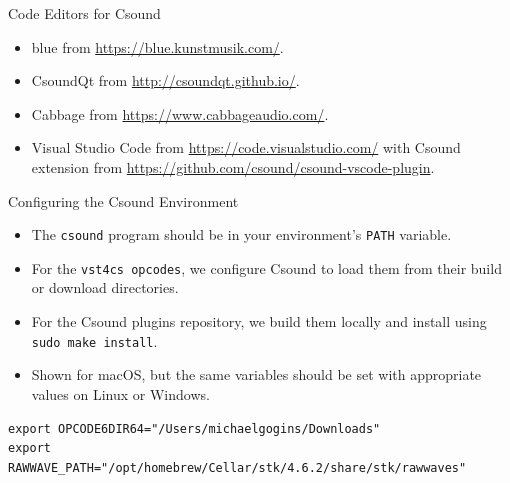 \documentclass{beamer}
\begin{document}
    \begin{frame}{Code Editors for Csound}
        \begin{itemize}
            \item blue from \url{https://blue.kunstmusik.com/}.
            \item CsoundQt from \url{http://csoundqt.github.io/}.
            \item Cabbage from \url{https://www.cabbageaudio.com/}.
            \item Visual Studio Code from \url{https://code.visualstudio.com/} with
            Csound extension from \url{https://github.com/csound/csound-vscode-plugin}.
        \end{itemize}
    \end{frame}
    
    \begin{frame}{Configuring the Csound Environment}
    	\begin{itemize}
		\item The \texttt{csound} program should be in your environment's \texttt{PATH} variable.
		\item For the \texttt{vst4cs opcodes}, we configure Csound to load them from their build or download directories.
		\item For the Csound plugins repository, we build them locally and install using \texttt{sudo make install}.
		\item Shown for macOS, but the same variables should be set with appropriate values on Linux or Windows.
	\end{itemize}
    \end{frame}    
    \begin{lstlisting}
export OPCODE6DIR64="/Users/michaelgogins/Downloads"
export RAWWAVE_PATH="/opt/homebrew/Cellar/stk/4.6.2/share/stk/rawwaves"
     \end{lstlisting}
    
\end{document}
